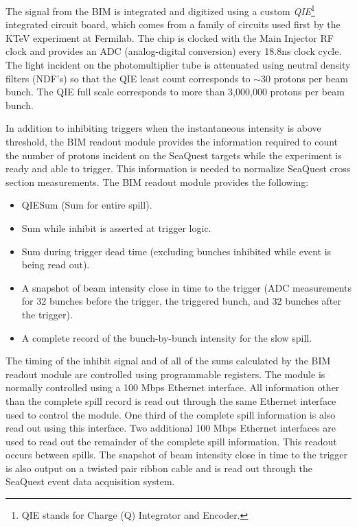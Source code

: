 The signal from the BIM is integrated and digitized using a custom \emph{QIE}\footnote{QIE stands for Charge (Q) Integrator and Encoder.} integrated circuit board, which comes from a family of circuits used first by the KTeV experiment at Fermilab\cite{QIE}.  The chip is clocked with the Main Injector RF clock and provides an ADC (analog-digital conversion) every 18.8ns clock cycle.  The light incident on the photomultiplier tube is attenuated using neutral density filters (NDF's) so that the QIE least count corresponds to $\sim$30 protons per beam bunch.  The QIE full scale corresponds to more than 3,000,000 protons per beam bunch. 

In addition to inhibiting triggers when the instantaneous intensity is above threshold, the BIM readout module provides the information required to count the number of protons incident on the SeaQuest targets while the experiment is ready and able to trigger.  This information is needed to normalize SeaQuest cross section measurements.  The BIM readout module provides the following:
\begin{itemize}
\item QIESum (Sum for entire spill).
\item Sum while inhibit is asserted at trigger logic.
\item Sum during trigger dead time (excluding bunches inhibited while event is being read out).
\item A snapshot of beam intensity close in time to the trigger (ADC measurements for 32 bunches before the trigger, the triggered bunch, and 32 bunches after the trigger).
\item A complete record of the bunch-by-bunch intensity for the slow spill.
\end{itemize}
The timing of the inhibit signal and of all of the sums calculated by the BIM readout module are controlled using programmable registers.  The module is normally controlled using a 100 Mbps Ethernet interface.  All information other than the complete spill record is read out through the same Ethernet interface used to control the module.  One third of the complete spill information is also read out using this interface.  Two additional 100 Mbps Ethernet interfaces are used to read out the remainder of the complete spill information.  This readout occurs between spills.  The snapshot of beam intensity close in time to the trigger is also output on a twisted pair ribbon cable and is read out through the SeaQuest event data acquisition system.

